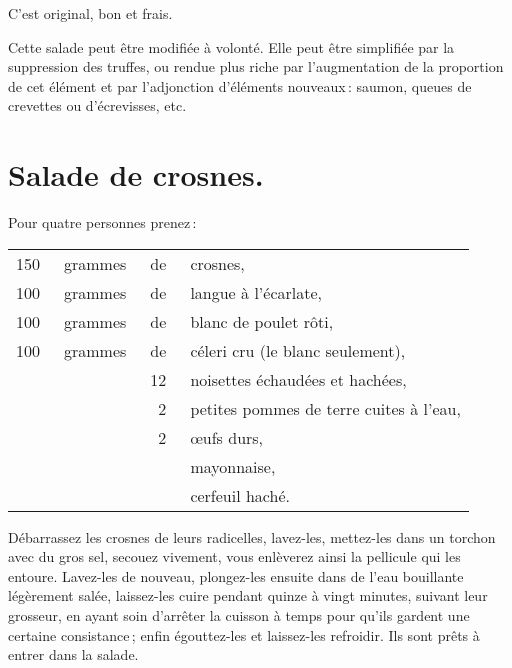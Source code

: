 C'est original, bon et frais.

\sk

Cette salade peut être modifiée à volonté. Elle peut être simplifiée par la
suppression des truffes, ou rendue plus riche par l'augmentation de la
proportion de cet élément et par l’adjonction d'éléments nouveaux : saumon,
queues de crevettes ou d'écrevisses, etc.

\section*{\centering Salade de crosnes.}
{}

Pour quatre personnes prenez :

\footnotesize
\begin{longtable}{rrrp{16em}}
    150 & grammes & de & crosnes,                                                                         \\
    100 & grammes & de & langue à l'écarlate,                                                             \\
    100 & grammes & de & blanc de poulet rôti,                                                            \\
    100 & grammes & de & céleri cru (le blanc seulement),                                                 \\
        &         & 12 & noisettes échaudées et hachées,                                                  \\
        &         &  2 & petites pommes de terre cuites à l'eau,                                          \\
        &         &  2 & œufs durs,                                                                       \\
        &         &    & mayonnaise,                                                                      \\
        &         &    & cerfeuil haché.                                                                  \\
\end{longtable}
\normalsize

Débarrassez les crosnes de leurs radicelles, lavez-les, mettez-les dans un
torchon avec du gros sel, secouez vivement, vous enlèverez ainsi la pellicule
qui les entoure. Lavez-les de nouveau, plongez-les ensuite dans de l’eau
bouillante légèrement salée, laissez-les cuire pendant quinze à vingt minutes,
suivant leur grosseur, en ayant soin d'arrêter la cuisson à temps pour qu'ils
gardent une certaine consistance ; enfin égouttez-les et laissez-les refroidir.
Ils sont prêts à entrer dans la salade.

